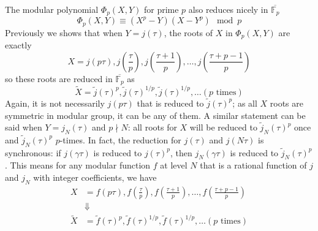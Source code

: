 \documentclass[]{article}
\begin{document}
The modular polynomial $\Phi_p(X, Y)$ for prime $p$ also reduces nicely in $\overline{\mathbb{F}_p}$
\[
\Phi_p(X, Y) \equiv (X^p - Y)(X - Y^p) \mod p
\]
Previously we shows that when $Y = j(\tau)$, the roots of $X$ in $\Phi_p(X, Y)$ are exactly
\[
X = j(p\tau), j\left(\frac{\tau}{p}\right), j\left(\frac{\tau + 1}{p}\right),\dots,j\left(\frac{\tau + p -1}{p}\right)
\]
so these roots are reduced in $\overline{\mathbb{F}_p}$ as
\[
\tilde{X} = \tilde{j}(\tau)^p, \tilde{j}(\tau)^{1/p}, \tilde{j}(\tau)^{1/p},\dots (\mbox{$p$ times})
\]
Again, it is not necessarily $j(p\tau)$ that is reduced to $\tilde{j}(\tau)^p$; as all $X$ roots are symmetric in modular group, it can be any of them. A similar statement can be said when $Y = j_N(\tau)$ and $p \nmid N$: all roots for $X$ will be reduced to $\tilde{j}_N(\tau)^p$ once and $\tilde{j}_N(\tau)^p$ $p$-times. In fact, the reduction for $j(\tau)$ and $j(N\tau)$ is synchronous: if $j(\gamma\tau)$ is reduced to $j(\tau)^p$, then $j_N(\gamma\tau)$ is reduced to $\tilde{j}_N(\tau)^p$. This means for any modular function $f$ at level $N$ that is a rational function of $j$ and $j_N$ with integer coefficients, we have
\begin{align*}
X &= f(p\tau), f\left(\frac{\tau}{p}\right), f\left(\frac{\tau + 1}{p}\right),\dots,f\left(\frac{\tau + p -1}{p}\right)\\
&\Downarrow\\
\tilde{X} &= \tilde{f}(\tau)^p, \tilde{f}(\tau)^{1/p}, \tilde{f}(\tau)^{1/p},\dots (\mbox{$p$ times})
\end{align*}
\end{document}

